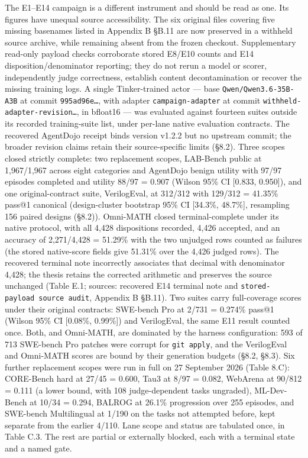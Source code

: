 \documentclass[12pt,a4paper]{report}
\begin{document}
The E1--E14 campaign is a different instrument and should be read as
one. Its figures have unequal source accessibility. The six original
files covering five missing basenames listed in Appendix B §B.11 are now
preserved in a withheld source archive, while remaining absent from the
frozen checkout. Supplementary read-only payload checks corroborate
stored E8/E10 counts and E14 disposition/denominator reporting; they do
not rerun a model or scorer, independently judge correctness, establish
content decontamination or recover the missing training logs. A single
Tinker-trained actor --- base \texttt{Qwen/Qwen3.6-35B-A3B} at commit
\texttt{995ad96e…}, with adapter \texttt{campaign-adapter} at commit
\texttt{withheld-adapter-revision…}, in bfloat16 --- was evaluated
against fourteen suites outside its recorded training-suite list, under
per-lane native evaluation contracts. The recovered AgentDojo receipt
binds version v1.2.2 but no upstream commit; the broader revision claims
retain their source-specific limits (§8.2). Three scopes closed strictly
complete: two replacement scopes, LAB-Bench public at 1,967/1,967 across
eight categories and AgentDojo benign utility with 97/97 episodes
completed and utility 88/97 = 0.907 (Wilson 95\% CI {[}0.833, 0.950{]}),
and one original-contract suite, VerilogEval, at 312/312 with 129/312 =
41.35\% pass@1 canonical (design-cluster bootstrap 95\% CI {[}34.3\%,
48.7\%{]}, resampling 156 paired designs (§8.2)). Omni-MATH closed
terminal-complete under its native protocol, with all 4,428 dispositions
recorded, 4,426 accepted, and an accuracy of 2,271/4,428 = 51.29\% with
the two unjudged rows counted as failures (the stored native-score
fields give 51.31\% over the 4,426 judged rows). The recovered terminal
note incorrectly associates that decimal with denominator 4,428; the
thesis retains the corrected arithmetic and preserves the source
unchanged (Table E.1; sources: recovered E14 terminal note and
\texttt{stored-payload\ source\ audit}, Appendix B §B.11). Two suites
carry full-coverage scores under their original contracts: SWE-bench Pro
at 2/731 = 0.274\% pass@1 (Wilson 95\% CI {[}0.08\%, 0.99\%{]}) and
VerilogEval, the same E11 result counted once. Both, and Omni-MATH, are
dominated by the harness configuration: 593 of 713 SWE-bench Pro patches
were corrupt for \texttt{git\ apply}, and the VerilogEval and Omni-MATH
scores are bound by their generation budgets (§8.2, §8.3). Six further
replacement scopes were run in full on 27 September 2026 (Table 8.C):
CORE-Bench hard at 27/45 = 0.600, Tau3 at 8/97 = 0.082, WebArena at
90/812 = 0.111 (a lower bound, with 108 judge-dependent tasks ungraded),
ML-Dev-Bench at 10/34 = 0.294, BALROG at 26.1\% progression over 255
episodes, and SWE-bench Multilingual at 1/190 on the tasks not attempted
before, kept separate from the earlier 4/110. Lane scope and status are
tabulated once, in Table C.3. The rest are partial or externally
blocked, each with a terminal state and a named gate.
\end{document}

